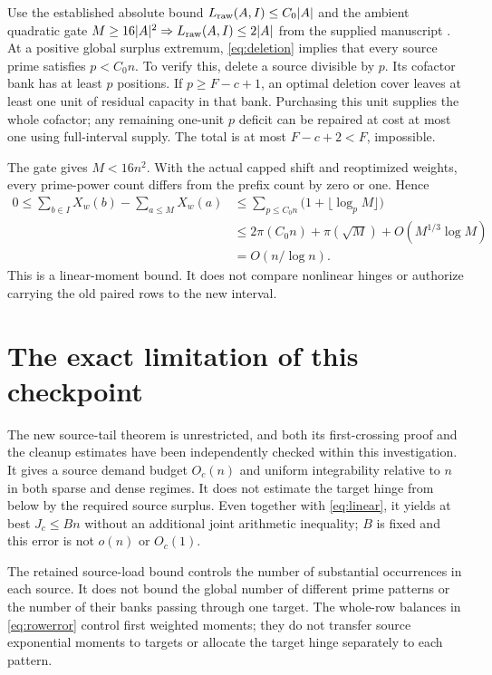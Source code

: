 \documentclass[11pt,a4paper]{article}
\newcommand{\LP}{L_{\rm raw}}
\begin{document}
Use the established absolute bound $\LP(A,I)\le C_0|A|$ and the
ambient quadratic gate $M\ge16|A|^2\Rightarrow\LP(A,I)\le2|A|$
from the supplied manuscript \cite{WangMain}. At a positive global
surplus extremum, \eqref{eq:deletion} implies that every source prime
satisfies $p<C_0n$. To verify this, delete a source divisible by $p$.
Its cofactor bank has at least $p$ positions. If $p\ge F-c+1$, an
optimal deletion cover leaves at least one unit of residual capacity
in that bank. Purchasing this unit supplies the whole cofactor; any
remaining one-unit $p$ deficit can be repaired at cost at most one
using full-interval supply. The total is at most $F-c+2<F$, impossible.

The gate gives $M<16n^2$. With the actual capped shift and reoptimized
weights, every prime-power count differs from the prefix count by zero
or one. Hence
\begin{equation}
 \begin{split}
 0\le\sum_{b\in I}X_w(b)-\sum_{a\le M}X_w(a)
 &\le\sum_{p\le C_0n}\bigl(1+\lfloor\log_pM\rfloor\bigr)\\
 &\le2\pi(C_0n)+\pi(\sqrt M)+O(M^{1/3}\log M)\\
 &=O(n/\log n).
 \end{split}                                          \label{eq:linear}
\end{equation}
This is a linear-moment bound. It does not compare nonlinear hinges or
authorize carrying the old paired rows to the new interval.

\section{The exact limitation of this checkpoint}

The new source-tail theorem is unrestricted, and both its first-crossing
proof and the cleanup estimates have been independently checked within
this investigation. It gives a source demand budget $O_c(n)$ and
uniform integrability relative to $n$ in both sparse and dense regimes.
It does not estimate the target hinge from below by the required source
surplus. Even together with \eqref{eq:linear}, it yields at best
$J_c\le Bn$ without an additional joint arithmetic inequality; $B$ is
fixed and this error is not $o(n)$ or $O_c(1)$.

The retained source-load bound controls the number of substantial
occurrences in each source. It does not bound the global number of
different prime patterns or the number of their banks passing through
one target. The whole-row balances in \eqref{eq:rowerror} control first
weighted moments; they do not transfer source exponential moments to
targets or allocate the target hinge separately to each pattern.
\end{document}
